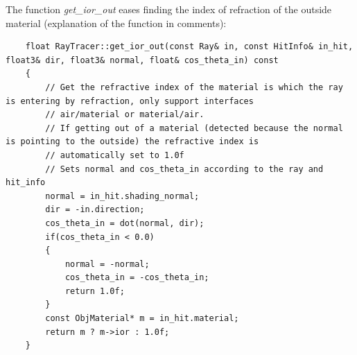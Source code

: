 \documentclass[a4,12pt]{article}
\begin{document}
	The function \textit{get\_ior\_out} eases finding the index of refraction of the outside material (explanation of the function in comments):
	\begin{lstlisting}
	float RayTracer::get_ior_out(const Ray& in, const HitInfo& in_hit, float3& dir, float3& normal, float& cos_theta_in) const
	{
		// Get the refractive index of the material is which the ray is entering by refraction, only support interfaces
		// air/material or material/air.
		// If getting out of a material (detected because the normal is pointing to the outside) the refractive index is
		// automatically set to 1.0f
		// Sets normal and cos_theta_in according to the ray and hit_info
		normal = in_hit.shading_normal;
		dir = -in.direction;
		cos_theta_in = dot(normal, dir);
		if(cos_theta_in < 0.0)
		{
			normal = -normal;
			cos_theta_in = -cos_theta_in;
			return 1.0f;
		}
		const ObjMaterial* m = in_hit.material;
		return m ? m->ior : 1.0f;
	}
	\end{lstlisting}
	
\end{document}
